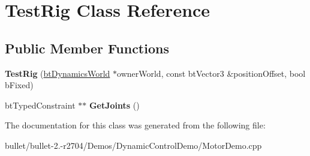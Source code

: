 \hypertarget{class_test_rig}{\section{Test\+Rig Class Reference}
\label{class_test_rig}
}
\subsection*{Public Member Functions}
\begin{DoxyCompactItemize}
\item 
\hypertarget{class_test_rig_a44119b539ac1ace50495d8a9b94a0559}{{\bfseries Test\+Rig} (\hyperlink{classbt_dynamics_world}{bt\+Dynamics\+World} $\ast$owner\+World, const bt\+Vector3 \&position\+Offset, bool b\+Fixed)}\label{class_test_rig_a44119b539ac1ace50495d8a9b94a0559}

\item 
\hypertarget{class_test_rig_a7bd8fc939908d1f03326e2cba97471fb}{bt\+Typed\+Constraint $\ast$$\ast$ {\bfseries Get\+Joints} ()}\label{class_test_rig_a7bd8fc939908d1f03326e2cba97471fb}

\end{DoxyCompactItemize}


The documentation for this class was generated from the following file\+:\begin{DoxyCompactItemize}
\item 
bullet/bullet-\/2.-\/r2704/\+Demos/\+Dynamic\+Control\+Demo/Motor\+Demo.\+cpp\end{DoxyCompactItemize}
